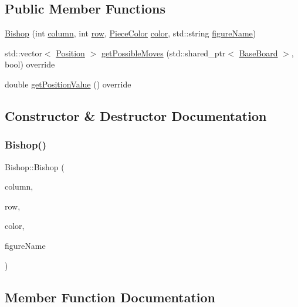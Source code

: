 \subsection*{Public Member Functions}
\begin{DoxyCompactItemize}
\item 
\hyperlink{class_bishop_a89b82abc3b5757e066039e47e398ca66}{Bishop} (int \hyperlink{class_piece_aa8f39e11280395103164f6ae07398c82}{column}, int \hyperlink{class_piece_ac6ef7c474f20562cb629c2452ce0631d}{row}, \hyperlink{_piece_8h_ad7595c48bb74c0dd2a7648712a2d4985}{Piece\+Color} \hyperlink{class_piece_a8dfe0501fe95a1a7618cf5ad3b9fda69}{color}, std\+::string \hyperlink{class_piece_af2fe809fd0d35d167f2419768e49fd3a}{figure\+Name})
\item 
std\+::vector$<$ \hyperlink{struct_position}{Position} $>$ \hyperlink{class_bishop_aed393094415a51e98e0c300da7f79100}{get\+Possible\+Moves} (std\+::shared\+\_\+ptr$<$ \hyperlink{class_base_board}{Base\+Board} $>$, bool) override
\item 
double \hyperlink{class_bishop_a03f53aab9a31cf09c3d252053231eedc}{get\+Position\+Value} () override
\end{DoxyCompactItemize}


\subsection{Constructor \& Destructor Documentation}
\mbox{\label{class_bishop_a89b82abc3b5757e066039e47e398ca66}} 
\subsubsection{\texorpdfstring{Bishop()}{Bishop()}}
{\footnotesize\ttfamily Bishop\+::\+Bishop (\begin{DoxyParamCaption}\item[{int}]{column,  }\item[{int}]{row,  }\item[{\hyperlink{_piece_8h_ad7595c48bb74c0dd2a7648712a2d4985}{Piece\+Color}}]{color,  }\item[{std\+::string}]{figure\+Name }\end{DoxyParamCaption})\hspace{0.3cm}{\ttfamily [inline]}}



\subsection{Member Function Documentation}
\mbox{\label{class_bishop_a03f53aab9a31cf09c3d252053231eedc}} 
